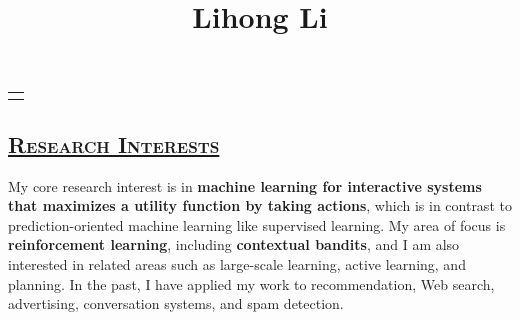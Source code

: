 \documentclass[10pt,twoside,letterpaper]{article}
\begin{document}
\title{\textmd{Lihong Li}}
\date{}
\maketitle


\vspace{-15mm} \noindent {}

\vspace{-5mm}
\begin{center}
\begin{tabular}{p{160mm}}
\toprule \\
\end{tabular}
\end{center}
\vspace{-8mm}

%

\subsection*{\textsc{\underline{Research Interests}}}


My core research interest is in \textbf{machine learning for interactive systems that maximizes a utility function by taking
actions}, which is in contrast to prediction-oriented machine learning like supervised learning. My area of focus is
\textbf{reinforcement learning}, including \textbf{contextual bandits}, and I am also interested in related areas such as large-scale learning, active learning, and planning. In the past, I have applied my work to recommendation,
Web search, advertising, conversation systems, and spam detection.
\end{document}
